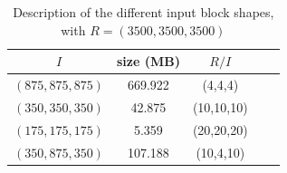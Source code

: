 \documentclass[sigconf, nonacm]{acmart}
\begin{document}
\begin{table}[ht]
  \centering
  \caption{Description of the different input block shapes, with $R=(3500,3500,3500)$}

   \begin{tabular}[t]{| c | c | c | c | c |}
   \hline
   $I$ & size (MB) & $R/I$ \\
   \hline
   $(875,875,875)$ & 669.922 & (4,4,4) \\
   \hline
   $(350,350,350)$ & 42.875 & (10,10,10) \\
   \hline
   $(175,175,175)$ & 5.359 & (20,20,20) \\
   \hline
   $(350,875,350)$ & 107.188 & (10,4,10) \\
   \hline
   \end{tabular}

   \label{tab:exp_inblocks}

\end{table}
\end{document}
